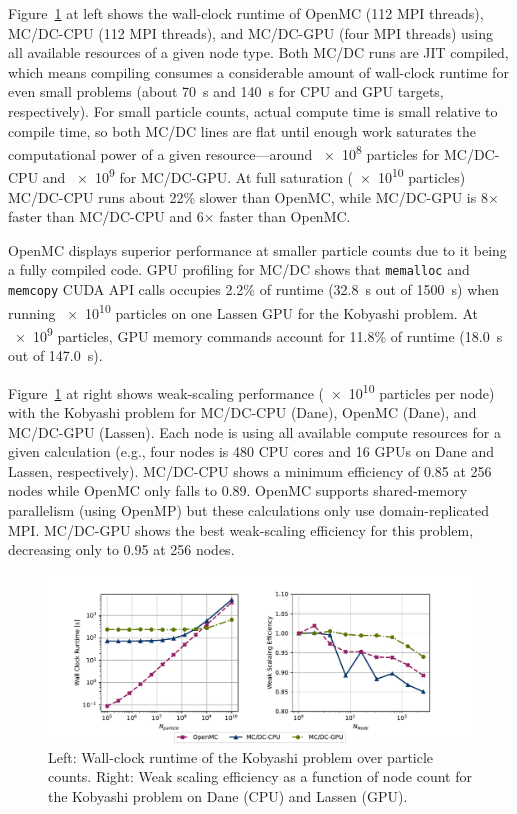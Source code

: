 Figure~\ref{performance_results} at left shows the wall-clock runtime of OpenMC (112 MPI threads), MC/DC-CPU (112 MPI threads), and MC/DC-GPU (four MPI threads) using all available resources of a given node type.
Both MC/DC runs are JIT compiled, which means compiling consumes a considerable amount of wall-clock runtime for even small problems (about \SI{70}{\s} and \SI{140}{\s} for CPU and GPU targets, respectively).
For small particle counts, actual compute time is small relative to compile time, so both MC/DC lines are flat until enough work saturates the computational power of a given resource---around \num{e8} particles for MC/DC-CPU and \num{e9} for MC/DC-GPU.
At full saturation (\num{e10} particles) MC/DC-CPU runs about 22\% slower than OpenMC, while MC/DC-GPU is 8$\times$ faster than MC/DC-CPU and 6$\times$ faster than OpenMC.

OpenMC displays superior performance at smaller particle counts due to it being a fully compiled code.
GPU profiling for MC/DC shows that
\texttt{memalloc} and \texttt{memcopy} CUDA API calls 
occupies 2.2\% of runtime (\SI{32.8}{\s} out of \SI{1500}{\s})
when running \num{e10} particles on one Lassen GPU for the Kobyashi problem.
At \num{e9} particles, GPU memory commands account for 11.8\% of runtime (\SI{18.0}{\s} out of \SI{147.0}{\s}).


Figure~\ref{performance_results} at right shows weak-scaling performance (\num{e10} particles per node) with the Kobyashi problem for MC/DC-CPU (Dane), OpenMC (Dane), and MC/DC-GPU (Lassen).
Each node is using all available compute resources for a given calculation (e.g., four nodes is 480 CPU cores and 16 GPUs on Dane and Lassen, respectively).
MC/DC-CPU shows a minimum efficiency of \num{0.85} at 256 nodes while OpenMC only falls to \num{0.89}.
OpenMC supports shared-memory parallelism (using OpenMP) but these calculations only use domain-replicated MPI.
MC/DC-GPU shows the best weak-scaling efficiency for this problem, decreasing only to \num{0.95} at 256 nodes.

\begin{figure}[h]
    \centerline{
    \includegraphics[width=1.1\textwidth]{monte_carlo/cise_paper/cise_figs/comps.pdf}
    }
    \caption{Left: Wall-clock runtime of the Kobyashi problem over particle counts. 
    Right: Weak scaling efficiency as a function of node count for the Kobyashi problem on Dane (CPU) and Lassen (GPU).}
    \label{performance_results}
\end{figure}


